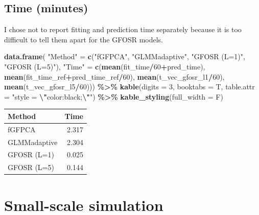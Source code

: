 \documentclass[
]{article}
\newenvironment{Shaded}{\begin{snugshade}}{\end{snugshade}}
\newcommand{\AttributeTok}[1]{\textcolor[rgb]{0.13,0.29,0.53}{#1}}
\newcommand{\DecValTok}[1]{\textcolor[rgb]{0.00,0.00,0.81}{#1}}
\newcommand{\FunctionTok}[1]{\textcolor[rgb]{0.13,0.29,0.53}{\textbf{#1}}}
\newcommand{\NormalTok}[1]{#1}
\newcommand{\OtherTok}[1]{\textcolor[rgb]{0.56,0.35,0.01}{#1}}
\newcommand{\SpecialCharTok}[1]{\textcolor[rgb]{0.81,0.36,0.00}{\textbf{#1}}}
\newcommand{\StringTok}[1]{\textcolor[rgb]{0.31,0.60,0.02}{#1}}
\begin{document}
\hypertarget{time-minutes}{%
\subsection{Time (minutes)}\label{time-minutes}}

I chose not to report fitting and prediction time separately because it
is too difficult to tell them apart for the GFOSR models.

\begin{Shaded}
\begin{Highlighting}[]
\FunctionTok{data.frame}\NormalTok{(}
  \StringTok{"Method"} \OtherTok{=} \FunctionTok{c}\NormalTok{(}\StringTok{"fGFPCA"}\NormalTok{, }\StringTok{"GLMMadaptive"}\NormalTok{, }\StringTok{"GFOSR (L=1)"}\NormalTok{, }\StringTok{"GFOSR (L=5)"}\NormalTok{),}
  \StringTok{"Time"} \OtherTok{=} \FunctionTok{c}\NormalTok{(}\FunctionTok{mean}\NormalTok{(fit\_time}\SpecialCharTok{/}\DecValTok{60}\SpecialCharTok{+}\NormalTok{pred\_time),}
             \FunctionTok{mean}\NormalTok{(fit\_time\_ref}\SpecialCharTok{+}\NormalTok{pred\_time\_ref}\SpecialCharTok{/}\DecValTok{60}\NormalTok{),}
             \FunctionTok{mean}\NormalTok{(t\_vec\_gfosr\_l1}\SpecialCharTok{/}\DecValTok{60}\NormalTok{), }
             \FunctionTok{mean}\NormalTok{(t\_vec\_gfosr\_l5}\SpecialCharTok{/}\DecValTok{60}\NormalTok{))) }\SpecialCharTok{\%\textgreater{}\%}
  \FunctionTok{kable}\NormalTok{(}\AttributeTok{digits =} \DecValTok{3}\NormalTok{, }\AttributeTok{booktabs =}\NormalTok{ T, }\AttributeTok{table.attr =} \StringTok{"style = }\SpecialCharTok{\textbackslash{}"}\StringTok{color:black;}\SpecialCharTok{\textbackslash{}"}\StringTok{"}\NormalTok{) }\SpecialCharTok{\%\textgreater{}\%}
  \FunctionTok{kable\_styling}\NormalTok{(}\AttributeTok{full\_width =}\NormalTok{ F) }
\end{Highlighting}
\end{Shaded}

\begin{table}
\centering
\begin{tabular}{lr}
\toprule
Method & Time\\
\midrule
fGFPCA & 2.317\\
GLMMadaptive & 2.304\\
GFOSR (L=1) & 0.025\\
GFOSR (L=5) & 0.144\\
\bottomrule
\end{tabular}
\end{table}

\hypertarget{small-scale-simulation}{%
\section{Small-scale simulation}\label{small-scale-simulation}}
\end{document}
